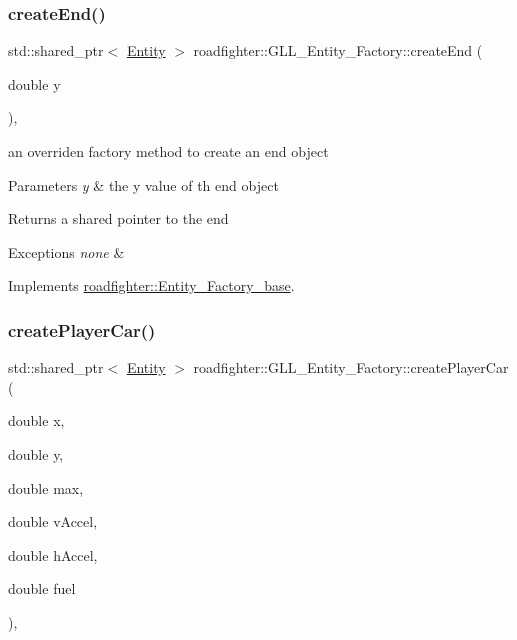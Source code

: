 \subsubsection{\texorpdfstring{create\+End()}{createEnd()}}
{\footnotesize\ttfamily std\+::shared\+\_\+ptr$<$ \hyperlink{classroadfighter_1_1Entity}{Entity} $>$ roadfighter\+::\+G\+L\+L\+\_\+\+Entity\+\_\+\+Factory\+::create\+End (\begin{DoxyParamCaption}\item[{double}]{y }\end{DoxyParamCaption})\hspace{0.3cm}{\ttfamily [override]}, {\ttfamily [virtual]}}

an overriden factory method to create an end object 
\begin{DoxyParams}{Parameters}
{\em y} & the y value of th end object \\
\hline
\end{DoxyParams}
\begin{DoxyReturn}{Returns}
a shared pointer to the end 
\end{DoxyReturn}

\begin{DoxyExceptions}{Exceptions}
{\em none} & \\
\hline
\end{DoxyExceptions}


Implements \hyperlink{classroadfighter_1_1Entity__Factory__base_a791574991ccbe7ff95f28e5651ed2cb1}{roadfighter\+::\+Entity\+\_\+\+Factory\+\_\+base}.

\mbox{\label{classroadfighter_1_1GLL__Entity__Factory_a45992523d105bd284b7aeed6cb41ce8a}} 
\subsubsection{\texorpdfstring{create\+Player\+Car()}{createPlayerCar()}}
{\footnotesize\ttfamily std\+::shared\+\_\+ptr$<$ \hyperlink{classroadfighter_1_1Entity}{Entity} $>$ roadfighter\+::\+G\+L\+L\+\_\+\+Entity\+\_\+\+Factory\+::create\+Player\+Car (\begin{DoxyParamCaption}\item[{double}]{x,  }\item[{double}]{y,  }\item[{double}]{max,  }\item[{double}]{v\+Accel,  }\item[{double}]{h\+Accel,  }\item[{double}]{fuel }\end{DoxyParamCaption})\hspace{0.3cm}{\ttfamily [override]}, {\ttfamily [virtual]}}

